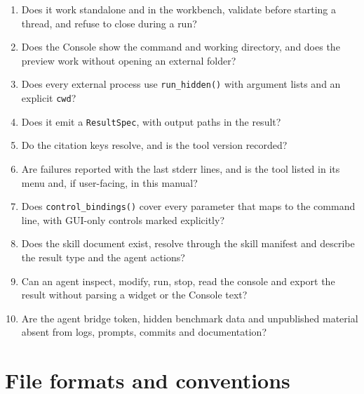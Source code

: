 \documentclass[10pt]{report}
\begin{document}
\begin{enumerate}
  \item Does it work standalone and in the workbench, validate before starting
        a thread, and refuse to close during a run?
  \item Does the Console show the command and working directory, and does the
        preview work without opening an external folder?
  \item Does every external process use \texttt{run\_hidden()} with argument
        lists and an explicit \texttt{cwd}?
  \item Does it emit a \texttt{ResultSpec}, with output paths in the result?
  \item Do the citation keys resolve, and is the tool version recorded?
  \item Are failures reported with the last stderr lines, and is the tool
        listed in its menu and, if user-facing, in this manual?
  \item Does \texttt{control\_bindings()} cover every parameter that maps to
        the command line, with GUI-only controls marked explicitly?
  \item Does the skill document exist, resolve through the skill manifest and
        describe the result type and the agent actions?
  \item Can an agent inspect, modify, run, stop, read the console and export
        the result without parsing a widget or the Console text?
  \item Are the agent bridge token, hidden benchmark data and unpublished
        material absent from logs, prompts, commits and documentation?
\end{enumerate}

\appendix
\chapter{File formats and conventions}
\end{document}
